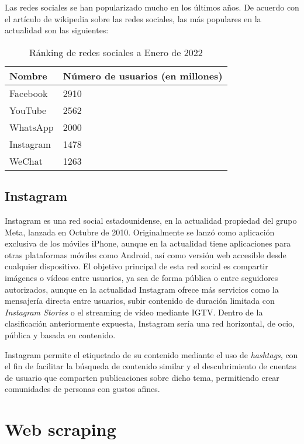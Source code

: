 Las redes sociales se han popularizado mucho en los últimos años. De acuerdo con el artículo de wikipedia sobre las redes sociales, las más populares en la actualidad son las siguientes:

\begin{table}[h]
    \centering
    \begin{tabular}{|l|l|}
        \hline
        Nombre    & Número de usuarios (en millones) \\ \hline
        Facebook  & 2910              \\ \hline
        YouTube   & 2562              \\ \hline
        WhatsApp  & 2000              \\ \hline
        Instagram & 1478              \\ \hline
        WeChat    & 1263              \\ \hline
    \end{tabular}
    \caption{Ránking de redes sociales a Enero de 2022}
    \label{tab:socmed_ranking}
\end{table}

\subsection{Instagram}

Instagram es una red social estadounidense, en la actualidad propiedad del grupo Meta, lanzada en Octubre de 2010. Originalmente se lanzó como aplicación exclusiva de los móviles iPhone, aunque en la actualidad tiene aplicaciones para otras plataformas móviles como Android, así como versión web accesible desde cualquier dispositivo. El objetivo principal de esta red social es compartir imágenes o vídeos entre usuarios, ya sea de forma pública o entre seguidores autorizados, aunque en la actualidad Instagram ofrece más servicios como la mensajería directa entre usuarios, subir contenido de duración limitada con \textit{Instagram Stories} o el streaming de vídeo mediante IGTV. Dentro de la clasificación anteriormente expuesta, Instagram sería una red horizontal, de ocio, pública y basada en contenido.

Instagram permite el etiquetado de su contenido mediante el uso de \textit{hashtags}, con el fin de facilitar la búsqueda de contenido similar y el descubrimiento de cuentas de usuario que comparten publicaciones sobre dicho tema, permitiendo crear comunidades de personas con gustos afines.

\section{Web scraping}

